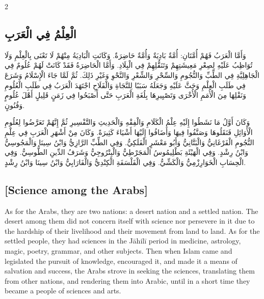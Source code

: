 \documentclass[11pt,a4paper]{article}
\newcommand{\ar}[1]{{\arabicfont\beginR #1\endR}}
\begin{document}
\begin{paracol}{2}
\sloppy

\begin{leftcolumn}
\subsection*{\ar{الْعِلْمُ فِي الْعَرَبِ}}
\vspace{0.3cm}
{\arabicfont\beginR
وَأَمَّا الْعَرَبُ فَهُمْ أُمَّتَانِ: أُمَّةٌ بَادِيَةٌ وَأُمَّةٌ حَاضِرَةٌ. وَكَانَتِ الْبَادِيَةُ مِنْهُمْ لَا تَعْنَى بِالْعِلْمِ وَلَا تُوَاظِبُ عَلَيْهِ لِصِعْرِ مَعِيشَتِهِمْ وَتَنَقُّلِهِمْ فِي الْبِلَادِ. وَأَمَّا الْحَاضِرَةُ فَقَدْ كَانَتْ لَهُمْ عُلُومٌ فِي الْجَاهِلِيَّةِ فِي الطِّبِّ وَالنُّجُومِ وَالسِّحْرِ وَالشِّعْرِ وَالنَّحْوِ وَغَيْرِ ذَلِكَ. ثُمَّ لَمَّا جَاءَ الْإِسْلَامُ وَشَرَعَ فِي طَلَبِ الْعِلْمِ وَحَثَّ عَلَيْهِ وَجَعَلَهُ سَبَبًا لِلنَّجَاةِ وَالْفَلَاحِ اجْتَهَدَ الْعَرَبُ فِي طَلَبِ الْعُلُومِ وَنَقْلِهَا مِنَ الْأُمَمِ الْأُخْرَى وَتَصْيِيرِهَا بِلُغَةِ الْعَرَبِ حَتَّى أَصْبَحُوا فِي زَمَنٍ قَلِيلٍ أَهْلَ عُلُومٍ وَفُنُونٍ.
\endR}

\vspace{0.3cm}
{\arabicfont\beginR
وَكَانَ أَوَّلُ مَا نَشَطُوا إِلَيْهِ عِلْمُ الْكَلَامِ وَالْفِقْهِ وَالْحَدِيثِ وَالتَّفْسِيرِ ثُمَّ إِنَّهُمْ تَعَرَّضُوا لِعُلُومِ الْأَوَائِلِ فَنَقَلُوهَا وَصَنَّفُوا فِيهَا وَأَضَافُوا إِلَيْهَا أَشْيَاءَ كَثِيرَةً. وَكَانَ مِنْ أَشْهَرِ الْعَرَبِ فِي عِلْمِ النُّجُومِ الْفَرْغَانِيُّ وَالْبَتَّانِيُّ وَأَبُو مَعْشَرٍ الْفَلَكِيُّ. وَفِي الطِّبِّ الرَّازِيُّ وَابْنُ سِينَا وَالْمَجُوسِيُّ وَابْنُ رِشْدٍ. وَفِي الْهَيْئَةِ بَطْلِيمُوسُ الْمَجَرْطِيُّ وَالْبِتْرُوجِيُّ وَشَرَفُ الدِّينِ الطُّوسِيُّ. وَفِي الْحِسَابِ الْخَوَارِزْمِيُّ وَالْكَشِّيُّ. وَفِي الْفَلْسَفَةِ الْكِنْدِيُّ وَالْفَارَابِيُّ وَابْنُ سِينَا وَابْنُ رِشْدٍ.
\endR}
\end{leftcolumn}

\begin{rightcolumn}
\subsection*{[Science among the Arabs]}
\vspace{0.3cm}
As for the Arabs, they are two nations: a desert nation and a settled nation. The desert among them did not concern itself with science nor persevere in it due to the hardship of their livelihood and their movement from land to land. As for the settled people, they had sciences in the J\={a}hil\={i} period in medicine, astrology, magic, poetry, grammar, and other subjects. Then when Islam came and legislated the pursuit of knowledge, encouraged it, and made it a means of salvation and success, the Arabs strove in seeking the sciences, translating them from other nations, and rendering them into Arabic, until in a short time they became a people of sciences and arts.


\end{rightcolumn}
\end{paracol}
\end{document}

